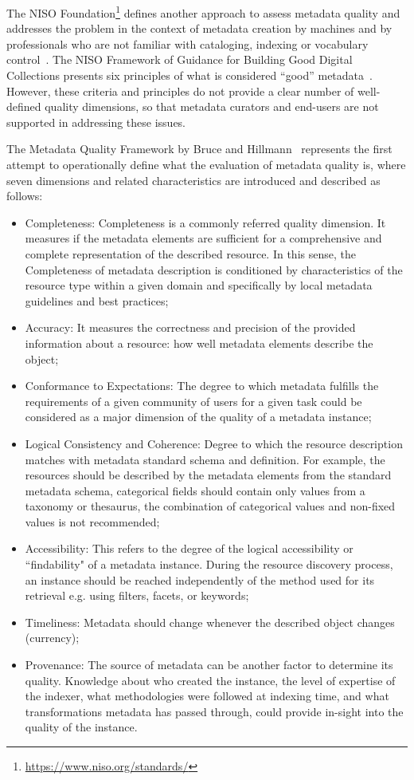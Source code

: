\documentclass[epsfig,a4paper,12pt,titlepage]{book}
\begin{document}
The NISO Foundation\footnote{\url{https://www.niso.org/standards/}} defines another approach to assess metadata quality and addresses the problem in the context of metadata creation by machines and by professionals who are not familiar with cataloging, indexing or vocabulary control~\cite{37}. The  NISO  Framework  of  Guidance  for  Building  Good  Digital  Collections  presents  six  principles  of  what  is  considered  ``good''  metadata~\cite{36}. However, these criteria and principles  do  not  provide  a  clear  number  of  well-defined  quality  dimensions, so that metadata curators and end-users are not supported in addressing these issues. 

 The Metadata Quality Framework by Bruce and Hillmann~\cite{1} represents the first attempt to operationally define what the evaluation of metadata quality is, where seven dimensions and related characteristics are introduced and described as follows:
\begin{itemize}	
\item Completeness: Completeness is a commonly referred quality dimension. It measures if the metadata elements are sufficient for a comprehensive and complete representation of the described resource. In this sense, the Completeness of metadata description is conditioned by characteristics of the resource type within a given domain and specifically by local metadata guidelines and best practices;

\item Accuracy: It measures the correctness and precision of the provided information about a resource: how well metadata elements describe the object; 
\item Conformance to Expectations: The degree to which metadata fulfills the requirements of a given community of users for a given task could be considered as a major dimension of the quality of a metadata instance; 
\item Logical Consistency and Coherence: Degree to which the resource description matches with metadata standard schema and definition. For example, the resources should be described by the metadata elements from the standard metadata schema, categorical fields should contain only values from a taxonomy or thesaurus, the combination of categorical values and non-fixed values is not recommended; 
\item Accessibility: This refers to the degree of the logical accessibility or ``findability" of a metadata instance. During the resource discovery process, an instance should be reached independently of the method used for its retrieval e.g. using filters, facets, or keywords;
\item Timeliness: Metadata should change whenever the described object changes (currency);
\item Provenance: The source of metadata can be another factor to determine its quality. Knowledge about who created the instance, the level of expertise of the indexer, what methodologies were followed at indexing time, and what transformations metadata has passed through, could provide in-sight into the quality of the instance.
\end{itemize}
\end{document}
